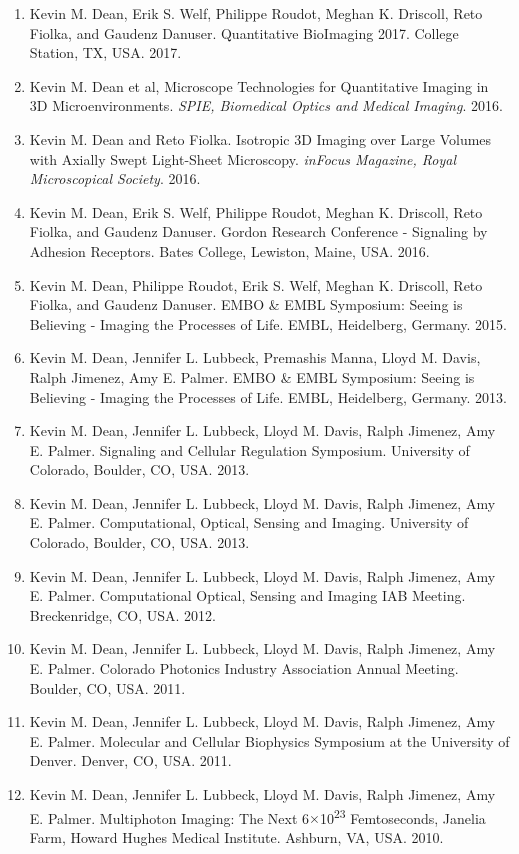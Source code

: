 \begin{enumerate}
\item Kevin M. Dean, Erik S. Welf, Philippe Roudot, Meghan K. Driscoll, Reto Fiolka, and Gaudenz Danuser.  Quantitative BioImaging 2017.  College Station, TX, USA. 2017.
\item Kevin M. Dean et al,  Microscope Technologies for Quantitative Imaging in 3D Microenvironments.  {\it SPIE, Biomedical Optics and Medical Imaging}.  2016.
\item Kevin M. Dean and Reto Fiolka. Isotropic 3D Imaging over Large Volumes with Axially Swept Light-Sheet Microscopy.  {\it inFocus Magazine, Royal Microscopical Society}.  2016.
\item Kevin M. Dean, Erik S. Welf, Philippe Roudot, Meghan K. Driscoll, Reto Fiolka, and Gaudenz Danuser.  Gordon Research Conference - Signaling by Adhesion Receptors.  Bates College, Lewiston, Maine, USA. 2016.
\item Kevin M. Dean, Philippe Roudot, Erik S. Welf, Meghan K. Driscoll, Reto Fiolka, and Gaudenz Danuser.  EMBO \& EMBL Symposium: Seeing is Believing - Imaging the Processes of Life.  EMBL, Heidelberg, Germany.  2015.
\item Kevin M. Dean, Jennifer L. Lubbeck, Premashis Manna, Lloyd M. Davis, Ralph Jimenez, Amy E. Palmer.  EMBO \& EMBL Symposium: Seeing is Believing - Imaging the Processes of Life.  EMBL, Heidelberg, Germany. 2013.
\item Kevin M. Dean, Jennifer L. Lubbeck, Lloyd M. Davis, Ralph Jimenez, Amy E. Palmer.  Signaling and Cellular Regulation Symposium.  University of Colorado, Boulder, CO, USA.  2013.
\item Kevin M. Dean, Jennifer L. Lubbeck, Lloyd M. Davis, Ralph Jimenez, Amy E. Palmer.  Computational, Optical, Sensing and Imaging.  University of Colorado, Boulder, CO, USA.  2013.
\item Kevin M. Dean, Jennifer L. Lubbeck, Lloyd M. Davis, Ralph Jimenez, Amy E. Palmer.  Computational Optical, Sensing and Imaging IAB Meeting.  Breckenridge, CO, USA.  2012.
\item Kevin M. Dean, Jennifer L. Lubbeck, Lloyd M. Davis, Ralph Jimenez, Amy E. Palmer.  Colorado Photonics Industry Association Annual Meeting.  Boulder, CO, USA. 2011.
\item Kevin M. Dean, Jennifer L. Lubbeck, Lloyd M. Davis, Ralph Jimenez, Amy E. Palmer.  Molecular and Cellular Biophysics Symposium at the University of Denver.  Denver, CO, USA. 2011.
\item Kevin M. Dean, Jennifer L. Lubbeck, Lloyd M. Davis, Ralph Jimenez, Amy E. Palmer.  Multiphoton Imaging: The Next 6$\times$10\textsuperscript{23} Femtoseconds, Janelia Farm, Howard Hughes Medical Institute.  Ashburn, VA, USA. 2010.

\end{enumerate}
